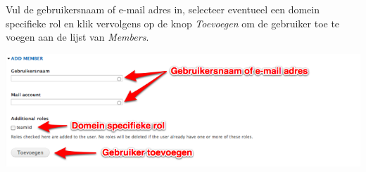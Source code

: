 \bigskip

Vul de gebruikersnaam of e-mail adres in, selecteer eventueel een domein specifieke rol en klik vervolgens op de knop \emph{Toevoegen} om de gebruiker toe te voegen aan de lijst van \emph{Members}.

\bigskip

\begin{center}
	\includegraphics[width=\textwidth]{img/dominion4.png}
\end{center}
